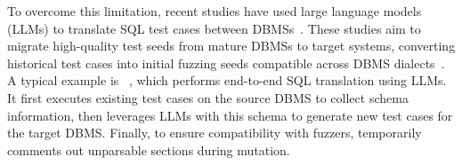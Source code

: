 \documentclass[sigconf,review,anonymous]{acmart}
\begin{document}


To overcome this limitation, recent studies have used large language models (LLMs) to translate SQL test cases between DBMSs~\cite{zhou2020database, xia2024fuzz4all, deng2023large}.
These studies aim to migrate high-quality test seeds from mature DBMSs to target systems, converting historical test cases into initial fuzzing seeds compatible across DBMS dialects~\cite{mundler2025type, lin2024sqless}.
A typical example is \sedar{}~\cite{fu2024sedar}, which performs end-to-end SQL translation using LLMs. It first executes existing test cases on the source DBMS to collect schema information, then leverages LLMs with this schema to generate new test cases for the target DBMS. Finally, to ensure compatibility with fuzzers, \sedar{} temporarily comments out unparsable sections during mutation.



\end{document}
